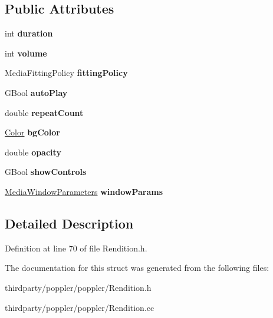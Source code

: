 \subsection*{Public Attributes}
\begin{DoxyCompactItemize}
\item 
\mbox{\label{struct_media_parameters_a05760fdb529833ebfd8a9f66b0214910}} 
int {\bfseries duration}
\item 
\mbox{\label{struct_media_parameters_a5a153189715229bc3e3d4cbcb3ec9324}} 
int {\bfseries volume}
\item 
\mbox{\label{struct_media_parameters_a1b98046756da6b7b1e61e50bd0ecf45e}} 
Media\+Fitting\+Policy {\bfseries fitting\+Policy}
\item 
\mbox{\label{struct_media_parameters_a0deaf0e1361d1282596b48dd9c226294}} 
G\+Bool {\bfseries auto\+Play}
\item 
\mbox{\label{struct_media_parameters_a96e83ca0a103621e62ff77bc0d84630e}} 
double {\bfseries repeat\+Count}
\item 
\mbox{\label{struct_media_parameters_a20134c0e6e9de10e8e36466074ad14bf}} 
\hyperlink{struct_media_parameters_1_1_color}{Color} {\bfseries bg\+Color}
\item 
\mbox{\label{struct_media_parameters_a1fe22089e96e8a4f3da122e80ad62925}} 
double {\bfseries opacity}
\item 
\mbox{\label{struct_media_parameters_aab673571a70ffd9a64b7cef0ac8bf9c1}} 
G\+Bool {\bfseries show\+Controls}
\item 
\mbox{\label{struct_media_parameters_ae9a517189b83375ac7d7be29816fd673}} 
\hyperlink{struct_media_window_parameters}{Media\+Window\+Parameters} {\bfseries window\+Params}
\end{DoxyCompactItemize}


\subsection{Detailed Description}


Definition at line 70 of file Rendition.\+h.



The documentation for this struct was generated from the following files\+:\begin{DoxyCompactItemize}
\item 
thirdparty/poppler/poppler/Rendition.\+h\item 
thirdparty/poppler/poppler/Rendition.\+cc\end{DoxyCompactItemize}
